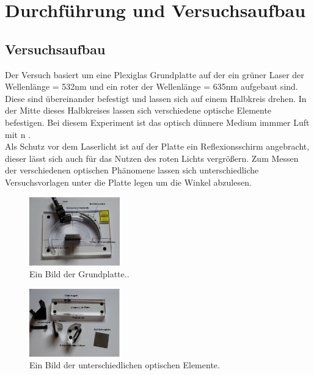 \newpage
\section{Durchführung und Versuchsaufbau}

    \subsection{Versuchsaufbau}
        
        Der Versuch basiert um eine Plexiglas Grundplatte auf der ein grüner Laser der Wellenlänge \lambda = 532nm und ein roter der Wellenlänge 
        \lambda = 635nm aufgebaut sind. Diese sind übereinander befestigt und lassen sich auf einem Halbkreis drehen. In der Mitte dieses Halbkreises lassen sich 
        verschiedene optische Elemente befestigen. Bei diesem Experiment ist das optisch dünnere Medium immmer Luft mit n .\\
        Als Schutz vor dem Laserlicht ist auf der Platte ein Reflexionsschirm angebracht, dieser lässt sich auch für das Nutzen des roten Lichts 
        vergrößern. Zum Messen der verschiedenen optischen Phänomene lassen sich unterschiedliche Versuchsvorlagen unter die Platte legen um die 
        Winkel abzulesen.

        \begin{figure}[H]
            \centering
            \includegraphics[width=0.35\textwidth]{latex/images/D1.PNG}
            \caption{Ein Bild der Grundplatte.\protect \cite{400}.}
        \end{figure}

        \begin{figure}[H]
            \centering
            \includegraphics[width=0.35\textwidth]{latex/images/D2.PNG}
            \caption{Ein Bild der unterschiedlichen optischen Elemente\protect \cite{400}.}
            \label{img:object}
        \end{figure}
        
